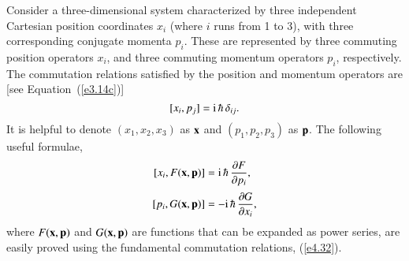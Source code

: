Consider a three-dimensional system characterized by three independent Cartesian
position coordinates $x_i$ (where $i$ runs from 1 to 3), with three corresponding
conjugate momenta $p_i$. These are represented by three commuting position
operators $x_i$, and three commuting momentum operators $p_i$, respectively. The 
commutation
relations  satisfied by the position and momentum operators
are [see Equation~(\ref{e3.14c})]
\begin{equation}\label{e4.32}
[x_i, p_j] = {\rm i}\,\hbar\, \delta_{ij}.
\end{equation}
It is helpful to denote $(x_1, x_2, x_3)$ as ${\bf x}$ and $(p_1, p_2, p_3)$ as 
${\bf p}$. The following useful formulae,
\begin{align}\label{e4.33a}
[x_i, F({\bf x},{\bf p})]& = {\rm i}\,\hbar \,\frac{\partial F}{\partial p_i},\\[0.5ex]
[p_i, G({\bf x},{\bf p})]& = - {\rm i}\,\hbar\,\frac{\partial G}{\partial x_i},\label{e4.33b}
\end{align}
where $F({\bf x},{\bf p})$ and $G({\bf x},{\bf p})$ are functions that can be expanded as  power series, are
easily proved using  the fundamental commutation relations, (\ref{e4.32}).

